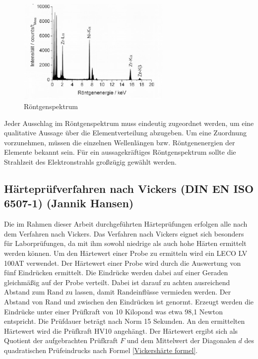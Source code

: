 \documentclass[a4paper, 11pt]{tubsreprt}
\begin{document}
\begin{figure}
\centering
\includegraphics[width=0.66\textwidth]{Bilder/Roentgenspektrum.png}
\caption[Röntgenspektrum]{Röntgenspektrum \cite{Gemming2013}}
\label{Röntgenspektrum1}
\end{figure}

Jeder Ausschlag im Röntgenspektrum muss eindeutig zugeordnet werden, um eine qualitative Aussage über die Elementverteilung abzugeben. Um eine Zuordnung vorzunehmen, müssen die einzelnen Wellenlängen bzw. Röntgenenergien der Elemente bekannt sein. Für ein aussagekräftiges Röntgenspektrum sollte die Strahlzeit des Elektronstrahls großzügig gewählt werden.   

\newpage


\subsection{Härteprüfverfahren nach Vickers (DIN EN ISO 6507-1) (Jannik Hansen)} \label{Kapitel Härte}
Die im Rahmen dieser Arbeit durchgeführten Härteprüfungen erfolgen alle nach dem Verfahren nach Vickers. Das Verfahren nach Vickers eignet sich besonders für Laborprüfungen, da mit ihm sowohl niedrige als auch hohe Härten ermittelt werden können. Um den Härtewert einer Probe zu ermitteln wird ein LECO LV 100AT verwendet. Der Härtewert einer Probe wird durch die Auswertung von fünf Eindrücken ermittelt. Die Eindrücke werden dabei auf einer Geraden gleichmäßig auf der Probe verteilt. Dabei ist darauf zu achten ausreichend Abstand zum Rand zu lassen, damit Randeinflüsse vermieden werden. Der Abstand von Rand und zwischen den Eindrücken ist genormt.
Erzeugt werden die Eindrücke unter einer Prüfkraft von 10 Kilopond was etwa 98,1 Newton entspricht. Die Prüfdauer beträgt nach Norm 15 Sekunden. An den ermittelten Härtewert wird die Prüfkraft HV10 angehängt. Der Härtewert ergibt sich als Quotient der aufgebrachten Prüfkraft $F$ und dem Mittelwert der Diagonalen $d$ des quadratischen Prüfeindrucks nach Formel \ref{Vickershärte formel}.
\end{document}
